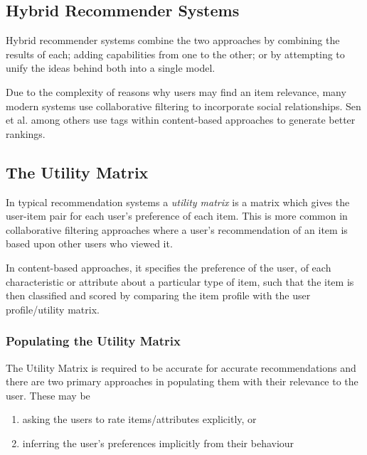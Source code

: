 \subsection{Hybrid Recommender Systems}

Hybrid recommender systems combine the two approaches by combining the results of each; adding capabilities from one to the other; or by attempting to unify the ideas behind both into a single model. 

Due to the complexity of reasons why users may find an item relevance, many modern systems \cite{ReferralWeb} use collaborative filtering to incorporate social relationships. Sen et al. \cite{SenTagommender} among others use tags within content-based approaches to generate better rankings. 

\subsection{The Utility Matrix}

In typical recommendation systems a \textit{utility matrix} is a matrix which gives the user-item pair for each user's preference of each item. This is more common in collaborative filtering approaches where a user's recommendation of an item is based upon other users who viewed it. 

In content-based approaches, it specifies the preference of the user, of each characteristic or attribute about a particular type of item, such that the item is then classified and scored by comparing the item profile with the user profile/utility matrix.

\subsubsection{Populating the Utility Matrix}

The Utility Matrix is required to be accurate for accurate recommendations and there are two primary approaches in populating them with their relevance to the user. These may be 
\begin{enumerate}
  \item asking the users to rate items/attributes explicitly, or
  \item inferring the user's preferences implicitly from their behaviour
\end{enumerate}

